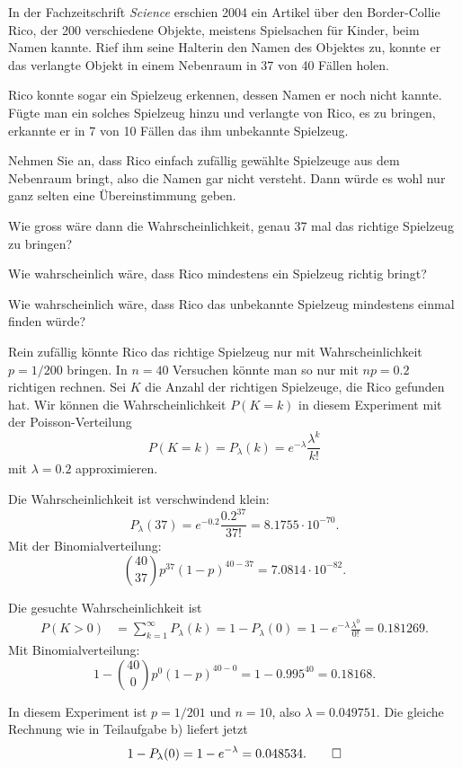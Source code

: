 In der Fachzeitschrift {\em Science} erschien 2004 ein Artikel über den
Border-Collie Rico, der 200 verschiedene Objekte, meistens Spielsachen
für Kinder, beim Namen kannte.
Rief ihm seine Halterin den Namen des Objektes zu, konnte er das verlangte
Objekt in einem Nebenraum in 37 von 40 Fällen holen.

Rico konnte sogar ein Spielzeug erkennen, dessen Namen er noch nicht
kannte.
Fügte man ein solches Spielzeug hinzu und verlangte von Rico, es zu bringen,
erkannte er in 7 von 10 Fällen das ihm unbekannte Spielzeug.

Nehmen Sie an, dass Rico einfach zufällig gewählte Spielzeuge aus
dem Nebenraum bringt, also die Namen gar nicht versteht.
Dann würde es wohl nur ganz selten eine Übereinstimmung geben.
\begin{teilaufgaben}
\item
Wie gross wäre dann die Wahrscheinlichkeit, genau 37 mal das richtige
Spielzeug zu bringen?
\item
Wie wahrscheinlich wäre, dass Rico mindestens ein Spielzeug richtig
bringt?
\item
Wie wahrscheinlich wäre, dass Rico das unbekannte Spielzeug mindestens
einmal finden würde?
\end{teilaufgaben}


\begin{loesung}
Rein zufällig könnte Rico das richtige Spielzeug nur mit Wahrscheinlichkeit
$p=1/200$ bringen.
In $n=40$ Versuchen könnte man so nur mit $np=0.2$ richtigen rechnen.
Sei $K$ die Anzahl der richtigen Spielzeuge, die Rico gefunden hat.
Wir können die Wahrscheinlichkeit $P(K=k)$ in diesem Experiment mit der
Poisson-Verteilung
\[
P(K=k)
=
P_\lambda(k)
=
e^{-\lambda}\frac{\lambda^k}{k!}
\]
mit $\lambda=0.2$ approximieren.
\begin{teilaufgaben}
\item
Die Wahrscheinlichkeit ist verschwindend klein:
\[
P_\lambda(37)
=
e^{-0.2}\frac{0.2^{37}}{37!}=8.1755\cdot10^{-70}.
\]
Mit der Binomialverteilung:
\[
\binom{40}{37}p^{37}(1-p)^{40-37}=7.0814\cdot10^{-82}.
\]
\item
Die gesuchte Wahrscheinlichkeit ist
\begin{align*}
P(K>0)
&=
\sum_{k=1}^\infty P_\lambda(k)
=
1-P_\lambda(0)
=
1-e^{-\lambda}\frac{\lambda^0}{0!}
=
0.181269.
\end{align*}
Mit Binomialverteilung:
\[
1-
\binom{40}{0}p^0(1-p)^{40-0}=1- 0.995^{40} = 0.18168.
\]
\item
In diesem Experiment ist $p=1/201$ und $n=10$, also $\lambda=0.049751$.
Die gleiche Rechnung wie in Teilaufgabe b) liefert jetzt
\[
1-P_\lambda(0)
=
1-e^{-\lambda}
=0.048534.
\qedhere
\]
\end{teilaufgaben}
\end{loesung}

